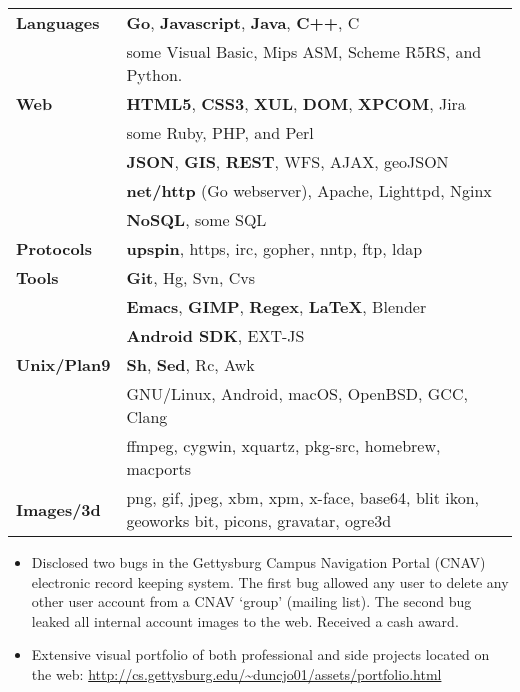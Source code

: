 \documentclass[11pt]{article}
\begin{document}
	\begin{tabular}{ l l }
  	\textbf{Languages} & \textbf{Go}, \textbf{Javascript}, \textbf{Java}, \textbf{C++}, C \\
  	& some Visual Basic, Mips ASM, Scheme R5RS, and Python. \\
  	
  	\textbf{Web} & \textbf{HTML5}, \textbf{CSS3}, \textbf{XUL}, \textbf{DOM}, \textbf{XPCOM}, Jira \\
  	& some Ruby, PHP, and Perl \\
  	& \textbf{JSON}, \textbf{GIS}, \textbf{REST}, WFS, AJAX, geoJSON \\
  	& \textbf{net/http} (Go webserver), Apache, Lighttpd, Nginx \\
  	& \textbf{NoSQL}, some SQL \\
  	\textbf{Protocols} & \textbf{upspin}, https, irc, gopher, nntp, ftp, ldap \\
  	
  	\textbf{Tools} & \textbf{Git}, Hg, Svn, Cvs \\
  	& \textbf{Emacs}, \textbf{GIMP}, \textbf{Regex}, \textbf{\LaTeX}, Blender \\
  	& \textbf{Android SDK}, EXT-JS \\
  	
  	\textbf{Unix/Plan9} & \textbf{Sh}, \textbf{Sed}, Rc, Awk \\
  	& GNU/Linux, Android, macOS, OpenBSD, GCC, Clang \\
  	& ffmpeg, cygwin, xquartz, pkg-src, homebrew, macports \\
  	\textbf{Images/3d} & png, gif, jpeg, xbm, xpm, x-face, base64, blit ikon, geoworks bit, picons, gravatar, ogre3d \\
  	
	\end{tabular}
\begin{itemize}
	\item Disclosed two bugs in the Gettysburg Campus Navigation Portal (CNAV) electronic record keeping system. The first bug allowed any user to delete any other user account from a CNAV `group' (mailing list). The second bug leaked all internal account images to the web. Received a cash award.
	\item Extensive visual portfolio of both professional and side projects located on the web: \url{http://cs.gettysburg.edu/~duncjo01/assets/portfolio.html}
\end{itemize}
\end{document}
